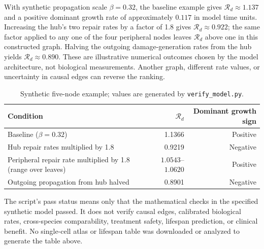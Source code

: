 \documentclass[11pt,a4paper]{article}
\newcommand{\Rd}{\mathcal{R}_{d}}
\begin{document}
With synthetic propagation scale $\beta=0.32$, the baseline example gives $\Rd\approx1.137$ and a positive dominant growth rate of approximately $0.117$ in model time units. Increasing the hub's two repair rates by a factor of 1.8 gives $\Rd\approx0.922$; the same factor applied to any one of the four peripheral nodes leaves $\Rd$ above one in this constructed graph. Halving the outgoing damage-generation rates from the hub yields $\Rd\approx0.890$. These are illustrative numerical outcomes chosen by the model architecture, not biological measurements. Another graph, different rate values, or uncertainty in causal edges can reverse the ranking.

\begin{table}[ht]
\centering
\caption{Synthetic five-node example; values are generated by \texttt{verify\_model.py}.}
\begin{tabularx}{\linewidth}{Xrr}
\toprule
Condition & $\Rd$ & Dominant growth sign\\
\midrule
Baseline ($\beta=0.32$) & 1.1366 & Positive\\
Hub repair rates multiplied by 1.8 & 0.9219 & Negative\\
Peripheral repair rate multiplied by 1.8 (range over leaves) & $1.0543$--$1.0620$ & Positive\\
Outgoing propagation from hub halved & 0.8901 & Negative\\
\bottomrule
\end{tabularx}
\end{table}

The script's pass status means only that the mathematical checks in the specified synthetic model passed. It does not verify causal edges, calibrated biological rates, cross-species comparability, treatment safety, lifespan prediction, or clinical benefit. No single-cell atlas or lifespan table was downloaded or analyzed to generate the table above.
\end{document}
